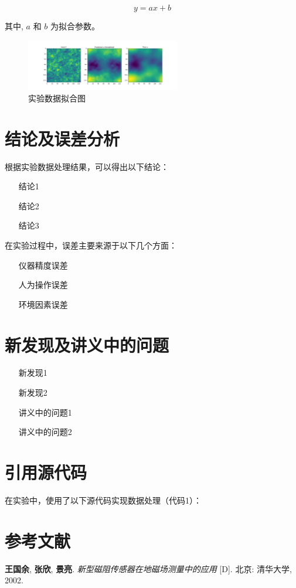 \documentclass[12pt,a4paper]{article}
\begin{document}
	\begin{equation} \label{eq:1}
		y = ax + b
	\end{equation}
	
	其中, \( a \) 和 \( b \) 为拟合参数。
	\begin{figure}[H]
		\centering
		\includegraphics[width=0.6\textwidth]{plot.png}
		\caption{实验数据拟合图}
		\label{fig:1}
	\end{figure}
	
	\section{结论及误差分析}
	根据实验数据处理结果，可以得出以下结论：
	
	\begin{itemize}
		\item [结论1]
		\item [结论2]
		\item [结论3]
	\end{itemize}
	
	在实验过程中，误差主要来源于以下几个方面：
	\begin{enumerate}
		\item [仪器精度误差]
		\item [人为操作误差]
		\item [环境因素误差]
	\end{enumerate}
	
	\section{新发现及讲义中的问题}
	\begin{itemize}
		\item [新发现1]
		\item [新发现2]
		\item [讲义中的问题1]
		\item [讲义中的问题2]
	\end{itemize}
	
	\section{引用源代码}
	在实验中，使用了以下源代码实现数据处理（代码1）：
	
	
	\section{参考文献}
	\begin{thebibliography}{99} %
		\textbf{王国余}, \textbf{张欣}, \textbf{景亮}. \emph{新型磁阻传感器在地磁场测量中的应用} [D]. 北京: 清华大学, 2002.
	\end{thebibliography}
	
	
\end{document}
